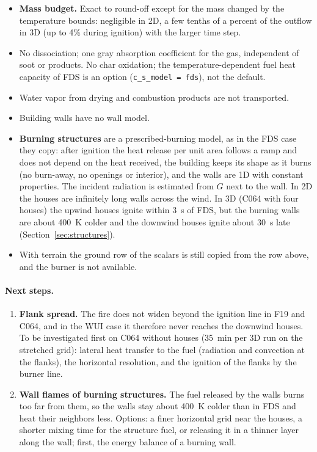 \documentclass[11pt,a4paper]{article}
\newcommand{\code}[1]{\texttt{#1}}
\begin{document}
\begin{itemize}
        stretched vertical grid (Section~\ref{sec:grid}) gives the same fire in 3D 2.4--3 times faster
        (F19 in 1.5~h, C064 in 35~min; Section~\ref{sec:validation}); \code{scripts/profile\_parts.py} measures the cost of each part
        of a step.
  \item \textbf{Mass budget.} Exact to round-off except for the mass changed by the temperature bounds:
        negligible in 2D, a few tenths of a percent of the outflow in 3D (up to 4\% during ignition) with
        the larger time step.
  \item No dissociation; one gray absorption coefficient for the gas, independent of soot or products.
        No char oxidation; the temperature-dependent fuel heat capacity of FDS is an option
        (\code{c\_s\_model = fds}), not the default.
  \item Water vapor from drying and combustion products are not transported.
  \item Building walls have no wall model.
  \item \textbf{Burning structures} are a prescribed-burning model, as in the FDS case they copy: after ignition
        the heat release per unit area follows a ramp and does not depend on the heat received, the
        building keeps its shape as it burns (no burn-away, no openings or interior), and the walls are 1D with
        constant properties. The incident radiation is estimated from $G$ next to the wall. In 2D the houses
        are infinitely long walls across the wind. In 3D (C064 with four houses) the upwind houses ignite
        within 3~s of FDS, but the burning walls are about 400~K colder and the downwind houses ignite about
        30~s late (Section~\ref{sec:structures}).
  \item With terrain the ground row of the scalars is still copied from the row above, and the burner is
        not available.
\end{itemize}

\paragraph{Next steps.}
\begin{enumerate}
  \item \textbf{Flank spread.} The fire does not widen beyond the ignition line in F19 and C064, and in the WUI
        case it therefore never reaches the downwind houses. To be investigated first on C064 without houses
        (35~min per 3D run on the stretched grid): lateral heat transfer to the fuel (radiation and
        convection at the flanks), the horizontal resolution, and the ignition of the flanks by the
        burner line.
  \item \textbf{Wall flames of burning structures.} The fuel released by the walls burns too far from them,
        so the walls stay about 400~K colder than in FDS and heat their neighbors less. Options: a finer
        horizontal grid near the houses, a shorter mixing time for the structure fuel, or releasing it in a
        thinner layer along the wall; first, the energy balance of a burning wall.
\end{enumerate}
\end{document}
